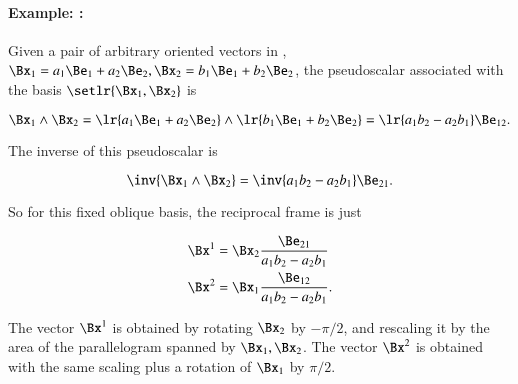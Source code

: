 \paragraph{Example: :}

Given a pair of arbitrary oriented vectors in , \( \Bx_1 = a_1 \Be_1 + a_2 \Be_2, \Bx_2 = b_1 \Be_1 + b_2 \Be_2 \), the pseudoscalar associated with the basis \( \setlr{ \Bx_1, \Bx_2} \) is

\begin{dmath}\label{eqn:reciprocal_R2:260}
\Bx_1 \wedge \Bx_2
=
\lr{ a_1 \Be_1 + a_2 \Be_2 } \wedge \lr{ b_1 \Be_1 + b_2 \Be_2 }
=
\lr{ a_1 b_2 - a_2 b_1 } \Be_{12}.
\end{dmath}

The inverse of this pseudoscalar is

\begin{dmath}\label{eqn:reciprocal_R2:280}
\inv{\Bx_1 \wedge \Bx_2 }
=
\inv{ a_1 b_2 - a_2 b_1 } \Be_{21}.
\end{dmath}

So for this fixed oblique  basis, the reciprocal frame is just

\begin{dmath}\label{eqn:reciprocal_R2:300}
\begin{aligned}
\Bx^1 &= \Bx_2 \frac{\Be_{21}}{ a_1 b_2 - a_2 b_1 } \\
\Bx^2 &= \Bx_1 \frac{\Be_{12}}{ a_1 b_2 - a_2 b_1 }.
\end{aligned}
\end{dmath}

The vector \( \Bx^1 \) is obtained by rotating \( \Bx_2 \) by \( -\pi/2 \), and rescaling it by the area of the parallelogram spanned by \( \Bx_1, \Bx_2 \).
The vector \( \Bx^2 \) is obtained with the same scaling plus a rotation of \( \Bx_1 \) by \( \pi/2 \).

